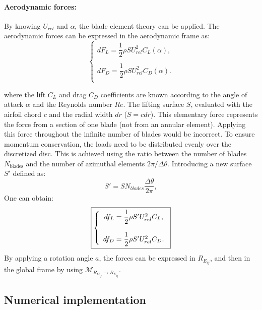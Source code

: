 \paragraph*{Aerodynamic forces:}
By knowing $U_{rel}$ and $\alpha$, the blade element theory can be applied. The aerodynamic forces can be expressed in the aerodynamic frame as:
\begin{equation}
\label{eq:eol_m_adr_eff}	
\left\lbrace
\begin{array}{ccc}	
dF_{L} = \dfrac{1}{2} \rho S U_{rel}^2 C_L(\alpha),
\\   
\\
dF_{D} = \dfrac{1}{2} \rho S U_{rel}^2 C_D(\alpha).
\\
\end{array}\right.
\end{equation}	

where the lift $C_L$ and drag $C_D$ coefficients are known according to the angle of attack $\alpha$ and the Reynolds number $Re$. The lifting surface $S$, evaluated with the airfoil chord $c$ and the radial width $dr$ ($S = c dr$).
\medbreak
This elementary force represents the force from a section of one blade (not from an annular element). Applying this force throughout the infinite number of blades would be incorrect. To ensure momentum conservation, the loads need to be distributed evenly over the discretized disc. This is achieved using the ratio between the number of blades $N_{\text{blades}}$ and the number of azimuthal elements $2\pi/\Delta\theta$. Introducing a new surface $S'$ defined as:
\begin{equation}
S' = S N_{blades} \dfrac{\Delta\theta}{2\pi},
\end{equation}
One can obtain:
\begin{equation}
\label{eq:eol_m_adr_final}        
\fbox{$
\left\lbrace
\begin{array}{ccc}      
df_{L} = \dfrac{1}{2} \rho S' U_{rel}^2 C_L,
\\   
\\
df_{D} = \dfrac{1}{2} \rho S' U_{rel}^2 C_D.
\\
\end{array}\right.
$}
\end{equation}
By applying a rotation angle $a$, the forces can be expressed in $R_{E_{ij}}$, and then in the global frame by using $\mathcal{M}_{R_{G_{ij}} \rightarrow R_{E_{ij}}}$.


\subsection{Numerical implementation}

